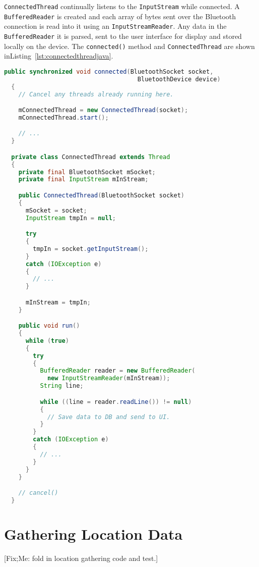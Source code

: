 \documentclass[11pt, a4paper, oneside, english]{scrbook}
\begin{document}
\texttt{ConnectedThread} continually listens to the \texttt{InputStream} while connected. A \texttt{BufferedReader} is created and each array of bytes sent over the Bluetooth connection is read into it using an \texttt{InputStreamReader}. Any data in the \texttt{BufferedReader} it is parsed, sent to the user interface for display and stored locally on the device. The \texttt{connected()} method and \texttt{ConnectedThread} are shown inListing~\ref{lst:connectedthreadjava}.
\begin{lstlisting}[language=Java,
                   caption={The \texttt{connected()} method and \texttt{ConnectedThread}},
                   label=lst:connectedthreadjava,
                   numbers=none]
  public synchronized void connected(BluetoothSocket socket,
                                     BluetoothDevice device)
  {
    // Cancel any threads already running here.

    mConnectedThread = new ConnectedThread(socket);
    mConnectedThread.start();

    // ...
  }

  private class ConnectedThread extends Thread
  {
    private final BluetoothSocket mSocket;
    private final InputStream mInStream;  

    public ConnectedThread(BluetoothSocket socket)
    {
      mSocket = socket;
      InputStream tmpIn = null;  

      try
      {
        tmpIn = socket.getInputStream();
      }
      catch (IOException e)
      {
        // ...
      }  

      mInStream = tmpIn;
    }

    public void run()
    {
      while (true)
      {
        try
        {
          BufferedReader reader = new BufferedReader(
            new InputStreamReader(mInStream));
          String line;  

          while ((line = reader.readLine()) != null)
          {
            // Save data to DB and send to UI.
          }
        }
        catch (IOException e)
        {
          // ...
        }
      }
    }

    // cancel()
  }
\end{lstlisting}
\section{Gathering Location Data} %
\label{sec:gathering_location_data}
[Fix;Me: fold in location gathering code and test.]
\end{document}
